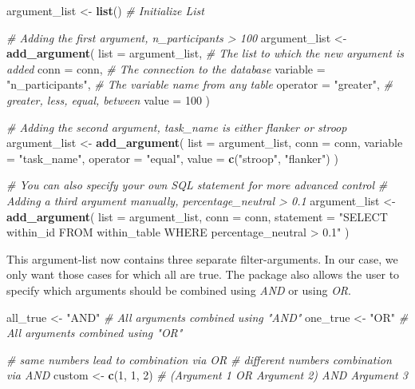 \documentclass[
  man,floatsintext]{apa6}
\newenvironment{Shaded}{\begin{snugshade}}{\end{snugshade}}
\newcommand{\AttributeTok}[1]{\textcolor[rgb]{0.13,0.29,0.53}{#1}}
\newcommand{\CommentTok}[1]{\textcolor[rgb]{0.56,0.35,0.01}{\textit{#1}}}
\newcommand{\DecValTok}[1]{\textcolor[rgb]{0.00,0.00,0.81}{#1}}
\newcommand{\FunctionTok}[1]{\textcolor[rgb]{0.13,0.29,0.53}{\textbf{#1}}}
\newcommand{\NormalTok}[1]{#1}
\newcommand{\OtherTok}[1]{\textcolor[rgb]{0.56,0.35,0.01}{#1}}
\newcommand{\StringTok}[1]{\textcolor[rgb]{0.31,0.60,0.02}{#1}}
\begin{document}
\begin{Shaded}
\begin{Highlighting}[]
\NormalTok{argument\_list }\OtherTok{\textless{}{-}} \FunctionTok{list}\NormalTok{() }\CommentTok{\# Initialize List}

\CommentTok{\# Adding the first argument, n\_participants \textgreater{} 100}
\NormalTok{argument\_list }\OtherTok{\textless{}{-}} \FunctionTok{add\_argument}\NormalTok{(}
  \AttributeTok{list =}\NormalTok{ argument\_list, }\CommentTok{\# The list to which the new argument is added}
  \AttributeTok{conn =}\NormalTok{ conn, }\CommentTok{\# The connection to the database}
  \AttributeTok{variable =} \StringTok{"n\_participants"}\NormalTok{, }\CommentTok{\# The variable name from any table}
  \AttributeTok{operator =} \StringTok{"greater"}\NormalTok{, }\CommentTok{\# greater, less, equal, between}
  \AttributeTok{value =} \DecValTok{100} 
\NormalTok{)}

\CommentTok{\# Adding the second argument, task\_name is either flanker or stroop}
\NormalTok{argument\_list }\OtherTok{\textless{}{-}} \FunctionTok{add\_argument}\NormalTok{(}
  \AttributeTok{list =}\NormalTok{ argument\_list,}
  \AttributeTok{conn =}\NormalTok{ conn,}
  \AttributeTok{variable =} \StringTok{"task\_name"}\NormalTok{,}
  \AttributeTok{operator =} \StringTok{"equal"}\NormalTok{,}
  \AttributeTok{value =} \FunctionTok{c}\NormalTok{(}\StringTok{"stroop"}\NormalTok{, }\StringTok{"flanker"}\NormalTok{)}
\NormalTok{)}

\CommentTok{\# You can also specify your own SQL statement for more advanced control}
\CommentTok{\# Adding a third argument manually, percentage\_neutral \textgreater{} 0.1}
\NormalTok{argument\_list }\OtherTok{\textless{}{-}} \FunctionTok{add\_argument}\NormalTok{(}
  \AttributeTok{list =}\NormalTok{ argument\_list,}
  \AttributeTok{conn =}\NormalTok{ conn,}
  \AttributeTok{statement =} \StringTok{"SELECT within\_id FROM within\_table WHERE percentage\_neutral \textgreater{} 0.1"}
\NormalTok{)}
\end{Highlighting}
\end{Shaded}

This argument-list now contains three separate filter-arguments. In our case, we only want those cases for which all are true. The package also allows the user to specify which arguments should be combined using \emph{AND} or using \emph{OR}.

\begin{Shaded}
\begin{Highlighting}[]
\NormalTok{all\_true }\OtherTok{\textless{}{-}} \StringTok{"AND"} \CommentTok{\# All arguments combined using "AND"}
\NormalTok{one\_true }\OtherTok{\textless{}{-}} \StringTok{"OR"} \CommentTok{\# All arguments combined using "OR"}

\CommentTok{\# same numbers lead to combination via OR}
\CommentTok{\# different numbers combination via AND}
\NormalTok{custom }\OtherTok{\textless{}{-}} \FunctionTok{c}\NormalTok{(}\DecValTok{1}\NormalTok{, }\DecValTok{1}\NormalTok{, }\DecValTok{2}\NormalTok{) }\CommentTok{\# (Argument 1 OR Argument 2) AND Argument 3}
\end{Highlighting}
\end{Shaded}
\end{document}
